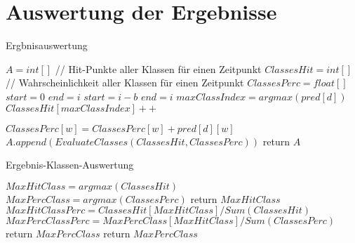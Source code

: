 \section{Auswertung der Ergebnisse}


    \begin{algorithm}
        \caption{Ergbnisauswertung}
        \begin{algorithmic}[1]
            \State {}
            \State
            \State ${A} = int[ ]$
                \State
                \State // Hit-Punkte aller Klassen für einen Zeitpunkt
                \State $ClassesHit = int[ ]$
                \State // Wahrscheinlichkeit aller Klassen für einen Zeitpunkt
                \State $ClassesPerc = float[ ]$
                \State
                    \State $start = 0$
                    \State $end = i$
                \Else
                    \State $start = i - b$
                    \State $end = i$
                \EndIf
                \State
                    \State $maxClassIndex = argmax(pred[d])$
                    \State $ClassesHit[maxClassIndex]++$

                        \State $ClassesPerc[w] = ClassesPerc[w] + pred[d][w]$
                    \EndFor
                \EndFor
                \State
                \State $A.append(EvaluateClasses(ClassesHit, ClassesPerc))$
                \State
            \EndFor
            \State return $A$
        \EndFunction
        \end{algorithmic}
    \end{algorithm}
    \begin{algorithm}
        \caption{Ergebnis-Klassen-Auswertung}
        \begin{algorithmic}[1]
            \State {}
            \State
            \State $MaxHitClass = argmax(ClassesHit)$
            \State $MaxPercClass = argmax(ClassesPerc)$
            \State
                \State return $MaxHitClass$
            \Else
                \State
                \State $MaxHitClassPerc = ClassesHit[MaxHitClass] / Sum(ClassesHit) $
                \State $MaxPercClassPerc = MaxPercClass[MaxHitClass] / Sum(ClassesPerc) $
                \State
                    \State return $MaxPercClass$
                \Else
                    \State return $MaxPercClass$
                \EndIf
            \EndIf
        \EndFunction
        \end{algorithmic}
    \end{algorithm}